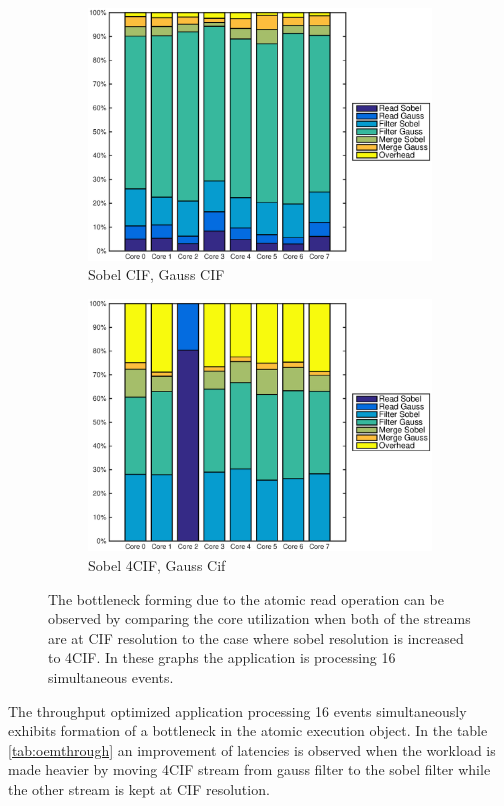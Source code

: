 \begin{figure}
    \centering
    \begin{subfigure}[t]{0.49\textwidth}
        \centering
        \includegraphics[width=0.99\linewidth]{images/openem_cifcif_8cores_eo.eps}
        \caption{Sobel CIF, Gauss CIF}
        \label{fig:oem8coreeo}
    \end{subfigure}
    \begin{subfigure}[t]{0.49\textwidth}
        \centering
        \includegraphics[width=0.99\linewidth]{images/openem_sobel4cif_gausscif_eo.eps}
        \caption{Sobel 4CIF, Gauss Cif}
        \label{fig:oem8coreeosobel4cif}
    \end{subfigure}
    \caption{The bottleneck forming due to the atomic read operation can be observed by comparing the core utilization when both of the streams are at CIF resolution to the case where sobel resolution is increased to 4CIF. In these graphs the application is processing 16 simultaneous events.}
\end{figure}
The throughput optimized application processing 16 events simultaneously exhibits formation of a bottleneck in the atomic execution object. In the table \ref{tab:oemthrough} an improvement of latencies is observed when the workload is made heavier by moving 4CIF stream from gauss filter to the sobel filter while the other stream is kept at CIF resolution.

